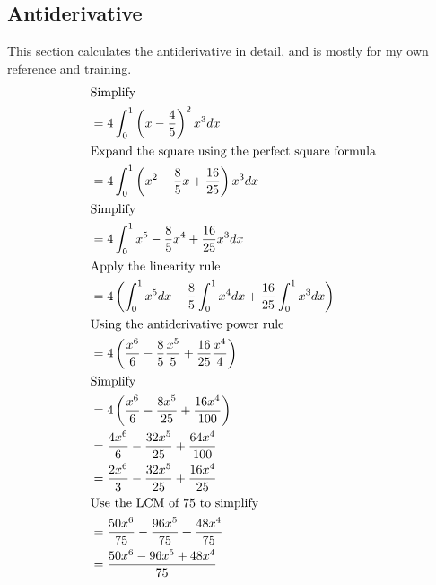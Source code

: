 \subsection{Antiderivative}
This section calculates the antiderivative in detail, and is mostly for my own reference and training.
\begin{align*}
	\intertext{Simplify}
	 & = 4 \int_{0}^{1} \left(x - \frac{4}{5}\right)^2 x^3 dx                                                     \\
	\intertext{Expand the square using the perfect square formula}
	 & = 4 \int_{0}^{1} \left(x^2 - \frac{8}{5}x + \frac{16}{25}\right) x^3 dx                                    \\
	\intertext{Simplify}
	 & = 4 \int_{0}^{1} x^5 - \frac{8}{5}x^4 + \frac{16}{25}x^3 dx                                                \\
	\intertext{Apply the linearity rule}
	 & = 4 \left(\int_{0}^{1} x^5 dx - \frac{8}{5} \int_{0}^{1} x^4 dx + \frac{16}{25} \int_{0}^{1} x^3 dx\right) \\
	\intertext{Using the antiderivative power rule}
	 & = 4 \left(\frac{x^6}{6} - \frac{8}{5} \frac{x^5}{5} + \frac{16}{25} \frac{x^4}{4}\right)                   \\
	\intertext{Simplify}
	 & = 4 \left(\frac{x^6}{6} - \frac{8x^5}{25} + \frac{16x^4}{100}\right)                                       \\
	 & = \frac{4x^6}{6} - \frac{32x^5}{25} + \frac{64x^4}{100}                                                    \\
	 & = \frac{2x^6}{3} - \frac{32x^5}{25} + \frac{16x^4}{25}                                                     \\
	\intertext{Use the LCM of 75 to simplify}
	 & = \frac{50x^6}{75} - \frac{96x^5}{75} + \frac{48x^4}{75}                                                   \\
	 & = \frac{50x^6 - 96x^5 + 48x^4}{75}                                                                         \\
\end{align*}
